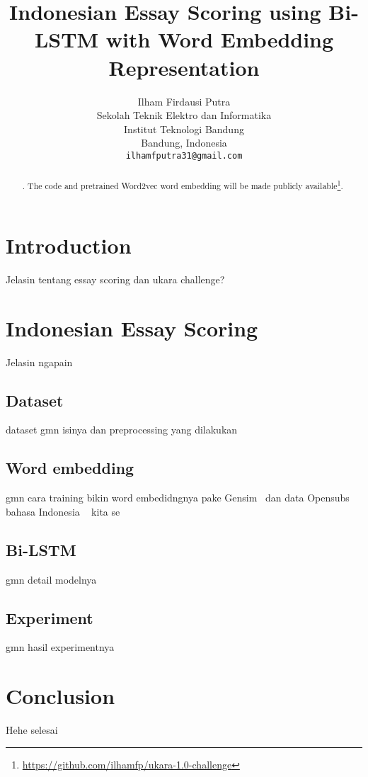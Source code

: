 \documentclass[11pt,a4paper]{article}
\title{Indonesian Essay Scoring using Bi-LSTM with Word Embedding Representation}
\author{Ilham Firdausi Putra \\
  Sekolah Teknik Elektro dan Informatika \\
  Institut Teknologi Bandung \\
  Bandung, Indonesia \\
  \texttt{ilhamfputra31@gmail.com} \\}
\date{}
\begin{document}
\maketitle
\begin{abstract}
  . The code and pretrained Word2vec word embedding will be made publicly available\footnote{\url{https://github.com/ilhamfp/ukara-1.0-challenge}}.
\end{abstract}

\section{Introduction}

Jelasin tentang essay scoring dan ukara challenge?

\section{Indonesian Essay Scoring}

Jelasin ngapain~\cite{Gusfield:97}



\subsection{Dataset}
dataset gmn isinya dan preprocessing yang dilakukan

\subsection{Word embedding}
gmn cara training bikin word embedidngnya pake Gensim~\cite{rehurek_lrec} dan data Opensubs bahasa Indonesia ~\cite{opensubs} kita se

\subsection{Bi-LSTM}
gmn detail modelnya

\subsection{Experiment}
gmn hasil experimentnya

\section{Conclusion}
Hehe selesai



\end{document}
